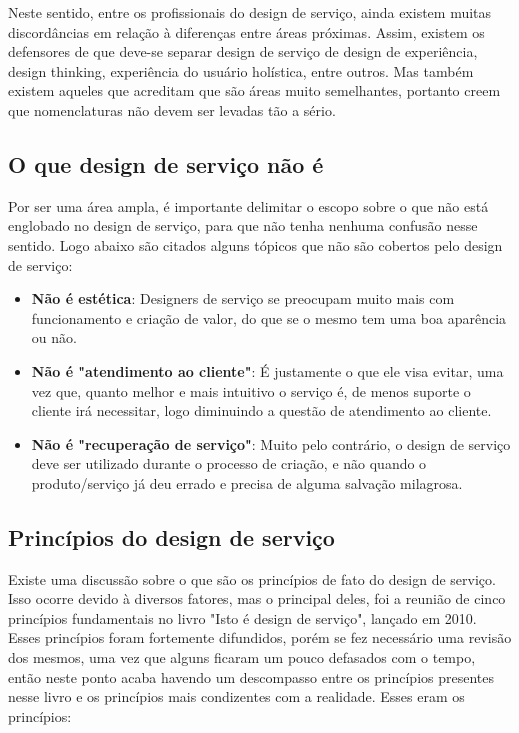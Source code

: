 Neste sentido, entre os profissionais do design de serviço, ainda existem muitas discordâncias em relação à diferenças entre áreas próximas. Assim, existem os defensores de que deve-se separar design de serviço de design de experiência, design thinking, experiência do usuário holística, entre outros. Mas também existem aqueles que acreditam que são áreas muito semelhantes, portanto creem que nomenclaturas não devem ser levadas tão a sério.

\subsection{O que design de serviço não é}

Por ser uma área ampla, é importante delimitar o escopo sobre o que não está englobado no design de serviço, para que não tenha nenhuma confusão nesse sentido. Logo abaixo são citados alguns tópicos que não são cobertos pelo design de serviço:

\begin{itemize}
	\item \textbf{Não é estética}: Designers de serviço se preocupam muito mais com funcionamento e criação de valor, do que se o mesmo tem uma boa aparência ou não.
	
	\item \textbf{Não é "atendimento ao cliente"}: É justamente o que ele visa evitar, uma vez que, quanto melhor e mais intuitivo o serviço é, de menos suporte o cliente irá necessitar, logo diminuindo a questão de atendimento ao cliente.
	
	\item \textbf{Não é "recuperação de serviço"}: Muito pelo contrário, o design de serviço deve ser utilizado durante o processo de criação, e não quando o produto/serviço já deu errado e precisa de alguma salvação milagrosa.
	
\end{itemize}

\subsection{Princípios do design de serviço}

Existe uma discussão sobre o que são os princípios de fato do design de serviço. Isso ocorre devido à diversos fatores, mas o principal deles, foi a reunião de cinco princípios fundamentais no livro "Isto é design de serviço", lançado em 2010. Esses princípios foram fortemente difundidos, porém se fez necessário uma revisão dos mesmos, uma vez que alguns ficaram um pouco defasados com o tempo, então neste ponto acaba havendo um descompasso entre os princípios presentes nesse livro e os princípios mais condizentes com a realidade. Esses eram os princípios:

